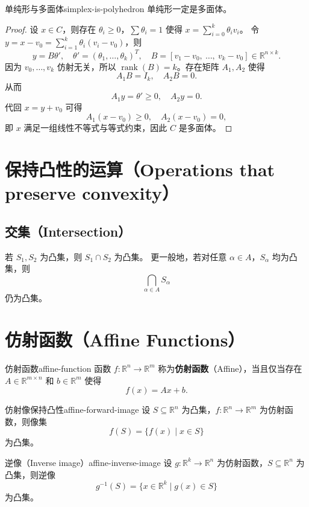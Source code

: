 \documentclass[11pt,a4paper]{article}
\begin{document}
\begin{theorem}{单纯形与多面体}{simplex-is-polyhedron}
单纯形一定是多面体。
\end{theorem}

\begin{proof}
设 $x \in C$，则存在 $\theta_i \geq 0$，$\sum \theta_i = 1$ 使得 $x = \sum_{i=0}^k \theta_i v_i$。
令 $y = x - v_0 = \sum_{i=1}^k \theta_i (v_i - v_0)$，则
\[
y = B \theta',\quad \theta' = (\theta_1, \dots, \theta_k)^T,\quad B = [v_1 - v_0,\ \dots,\ v_k - v_0] \in \mathbb{R}^{n \times k}.
\]
因为 $v_0,\dots,v_k$ 仿射无关，所以 $\operatorname{rank}(B) = k$。存在矩阵 $A_1, A_2$ 使得
\[
A_1 B = I_k,\quad A_2 B = 0.
\]
从而
\[
A_1 y = \theta' \geq 0,\quad A_2 y = 0.
\]
代回 $x = y + v_0$ 可得
\[
A_1(x - v_0) \geq 0,\quad A_2(x - v_0) = 0,
\]
即 $x$ 满足一组线性不等式与等式约束，因此 $C$ 是多面体。
\end{proof}

\section{保持凸性的运算（Operations that preserve convexity）}

\subsection{交集（Intersection）}
若 $S_1, S_2$ 为凸集，则 $S_1 \cap S_2$ 为凸集。
更一般地，若对任意 $\alpha \in A$，$S_\alpha$ 均为凸集，则
\[
\bigcap_{\alpha \in A} S_\alpha
\]
仍为凸集。

\section{仿射函数（Affine Functions）}

\begin{definition}{仿射函数}{affine-function}
函数 $f: \mathbb{R}^n \to \mathbb{R}^m$ 称为\textbf{仿射函数}（Affine），当且仅当存在 $A \in \mathbb{R}^{m \times n}$ 和 $b \in \mathbb{R}^m$ 使得
\[
f(x) = Ax + b.
\]
\end{definition}

\begin{theorem}{仿射像保持凸性}{affine-forward-image}
设 $S \subseteq \mathbb{R}^n$ 为凸集，$f: \mathbb{R}^n \to \mathbb{R}^m$ 为仿射函数，则像集
\[
f(S) = \{ f(x) \mid x \in S \}
\]
为凸集。
\end{theorem}

\begin{theorem}{逆像（Inverse image）}{affine-inverse-image}
设 $g: \mathbb{R}^k \to \mathbb{R}^n$ 为仿射函数，$S \subseteq \mathbb{R}^n$ 为凸集，则逆像
\[
g^{-1}(S) = \{ x \in \mathbb{R}^k \mid g(x) \in S \}
\]
为凸集。
\end{theorem}
\end{document}
